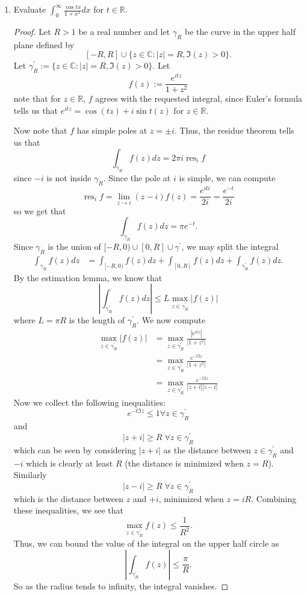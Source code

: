\documentclass{article}
\DeclareMathOperator{\res}{res}
\begin{document}
\begin{enumerate}
\item Evaluate $\displaystyle \int_0^\infty \frac{\cos tx}{1+x^2} dx $ for $t \in \mathbb{R}$.

\begin{proof}
Let $R > 1$ be a real number and let $\gamma_R$ be the curve in the upper half plane 
defined by \[[-R,R] \cup \{ z \in \mathbb{C} : |z| = R, \Im( z) > 0\}.\]
Let $\gamma^\prime_R:=\{ z \in \mathbb{C} : |z| = R, \Im( z) > 0\}$.
Let \[f(z) := \frac{e^{itz}}{1+z^2}\]
note that for $z \in \mathbb{R}$, $f$ agrees with the requested integral,
since Euler's formula tells us that $e^{i t z} = \cos (tz) + i \sin t(z)$ for $z \in \mathbb{R}$.

Now note that $f$ has simple poles at $z = \pm i$. Thus, the residue theorem tells us that
\[ \int_{\gamma_R} f(z) dz = 2\pi i \res_{i} f\]
since $- i$ is not inside $\gamma_R$.
Since the pole at $i$ is simple, we can compute
\[ \res_i f = \lim_{z \rightarrow i} (z-i) f(z) = \frac{e^{i t i}}{2i} = \frac{e^{-t}}{2i}\]
so we get that 
\[ \int_{\gamma_R} f(z) dz = \pi e^{-t}.\]
Since $\gamma_R$ is the union of $[-R,0) \cup [0,R] \cup \gamma^\prime$, we may split the integral
\begin{align*}
\int_{\gamma_R} f(z) dz &= \int_{[-R,0)} f(z) dz + \int_{[0,R]} f(z) dz + \int_{\gamma^\prime_R} f(z)dz.
\end{align*}
By the estimation lemma, we know that 
\[ \left |\int_{\gamma^\prime_R} f(z) dz \right | \leq L \max_{z \in \gamma_R^\prime} |f(z)|\]
where $L = \pi R$ is the length of $\gamma^\prime_R$.
We now compute 
\begin{align*}
 \max_{z \in \gamma_R^\prime} |f(z)| &=  \max_{z \in \gamma_R^\prime} \frac{|e^{itz}|}{|1+z^2|}\\
&=  \max_{z \in \gamma_R^\prime} \frac{e^{-t\Im z}}{|1+z^2|}\\
&=  \max_{z \in \gamma_R^\prime} \frac{e^{-t\Im z}}{|z+i||z-i|}
\end{align*}
Now we collect the following inequalities:
\[ e^{-t \Im z} \leq 1 \forall z \in \gamma_R^\prime\]
and
\[ |z +i  | \geq R \; \forall z \in \gamma_R^\prime\]
which can be seen by considering $|z+i|$ as the distance between $z \in \gamma_R^\prime$
and $-i$ which is clearly at least $R$ (the distance is minimized when $z = R$).
Similarly
\[ |z - i | \geq R \; \forall z \in \gamma_R^\prime\]
which is the distance between $z$ and $+i$, minimized when $z=iR$.
Combining these inequalities, we see that 
\[\max_{z \in \gamma_R^\prime} f(z) \leq \frac{1}{R^2}.\]
Thus, we can bound the value of the integral on the upper half circle as
\[ |\int_{\gamma^\prime_R} f(z) |\leq \frac{\pi}{R}.\]
So as the radius tends to infinity, the integral vanishes.


\end{proof}
\end{enumerate}
\end{document}
